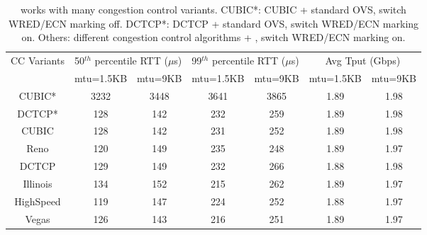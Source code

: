 \begin{table}[!t]
\tiny
\begin{center}
\begin{tabular}{ |c|c|c|c|c|c|c| }
 \hline
 \multirow{2}{*}{CC Variants} & \multicolumn{2}{|c|}{50$^{th}$ percentile RTT ($\mu$s)} & \multicolumn{2}{|c|}{99$^{th}$ percentile RTT ($\mu$s)} & \multicolumn{2}{|c|}{Avg Tput (Gbps)}\\
 \cline{2-7}
       &  mtu=1.5KB & mtu=9KB & mtu=1.5KB & mtu=9KB & mtu=1.5KB & mtu=9KB \\
 \hline
 \hline
 CUBIC* &  3232     &   3448    &   3641     &  3865     &   1.89    & 1.98   \\
 DCTCP* &  128      &   142    &   232    &   259    &   1.89    &   1.98  \\
 \hline
 \hline
 CUBIC &   128     &   142    &    231    &   252    &   1.89    &  1.98   \\
 Reno  &   120     &   149    &    235    &   248    &   1.89    &  1.97   \\
DCTCP  &   129     &   149    &    232    &   266    &   1.88    &  1.98    \\
Illinois  &   134     &   152    &    215    &  262     &   1.89    &  1.97    \\
HighSpeed  &   119     &  147     &    224    &  252     &   1.88    & 1.97     \\
 Vegas  &   126     &   143    &    216    &    251   &   1.89    &  1.97   \\

 \hline

\end{tabular}
\caption{\acdc{} works with many congestion control variants.
        CUBIC*: CUBIC + standard OVS, switch WRED/ECN marking off.
        DCTCP*: DCTCP + standard OVS, switch WRED/ECN marking on.
        Others: different congestion control algorithms + \acdc{}, switch WRED/ECN marking on.}
\label{other_cc_variants}
\end{center}
\end{table}

